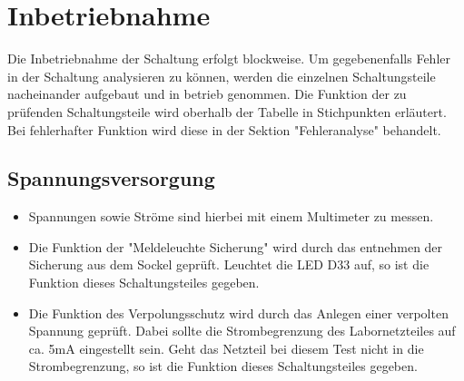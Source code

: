 \section{Inbetriebnahme}


\begin{center}
Die Inbetriebnahme der Schaltung erfolgt blockweise. Um gegebenenfalls Fehler in der Schaltung analysieren zu können, werden die einzelnen Schaltungsteile nacheinander aufgebaut und in betrieb genommen. Die Funktion der zu prüfenden Schaltungsteile wird oberhalb der Tabelle in Stichpunkten erläutert. Bei fehlerhafter Funktion wird diese in der Sektion "Fehleranalyse" behandelt.
\end{center}



\subsection{Spannungsversorgung}


\begin{itemize}
	\item{Spannungen sowie Ströme sind hierbei mit einem Multimeter zu messen.}
	
	\item{Die Funktion der "Meldeleuchte Sicherung" wird durch das entnehmen der Sicherung aus dem Sockel geprüft. Leuchtet die LED D33 auf, so ist die Funktion dieses Schaltungsteiles gegeben.}
	
	\item{Die Funktion des Verpolungsschutz wird durch das Anlegen einer verpolten Spannung geprüft. Dabei sollte die Strombegrenzung des Labornetzteiles auf ca. 5mA eingestellt sein. Geht das Netzteil bei diesem Test nicht in die Strombegrenzung, so ist die Funktion dieses Schaltungsteiles gegeben.}
\end{itemize}


